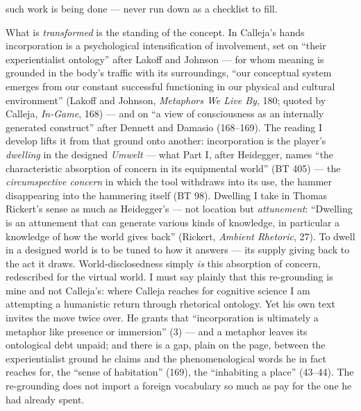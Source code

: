 \documentclass{article}
\begin{document}
such work is being done — never run down as a checklist to fill.

What is \textit{transformed} is the standing of the concept. In Calleja's hands incorporation is a psychological intensification of involvement, set on ``their experientialist ontology'' after Lakoff and Johnson — for whom meaning is grounded in the body's traffic with its surroundings, ``our conceptual system emerges from our constant successful functioning in our physical and cultural environment'' (Lakoff and Johnson, \textit{Metaphors We Live By}, 180; quoted by Calleja, \textit{In-Game}, 168) — and on ``a view of consciousness as an internally generated construct'' after Dennett and Damasio (168–169). The reading I develop lifts it from that ground onto another: incorporation is the player's \textit{dwelling} in the designed \textit{Umwelt} — what Part I, after Heidegger, names ``the characteristic absorption of concern in its equipmental world'' (BT 405) — the \textit{circumspective concern} in which the tool withdraws into its use, the hammer disappearing into the hammering itself (BT 98). Dwelling I take in Thomas Rickert's sense as much as Heidegger's — not location but \textit{attunement}: ``Dwelling is an attunement that can generate various kinds of knowledge, in particular a knowledge of how the world gives back'' (Rickert, \textit{Ambient Rhetoric}, 27). To dwell in a designed world is to be tuned to how it answers — its supply giving back to the act it draws. World-disclosedness simply \textit{is} this absorption of concern, redescribed for the virtual world. I must say plainly that this re-grounding is mine and not Calleja's: where Calleja reaches for cognitive science I am attempting a humanistic return through rhetorical ontology. Yet his own text invites the move twice over. He grants that ``incorporation is ultimately a metaphor like presence or immersion'' (3) — and a metaphor leaves its ontological debt unpaid; and there is a gap, plain on the page, between the experientialist ground he claims and the phenomenological words he in fact reaches for, the ``sense of habitation'' (169), the ``inhabiting a place'' (43–44). The re-grounding does not import a foreign vocabulary so much as pay for the one he had already spent.
\end{document}
